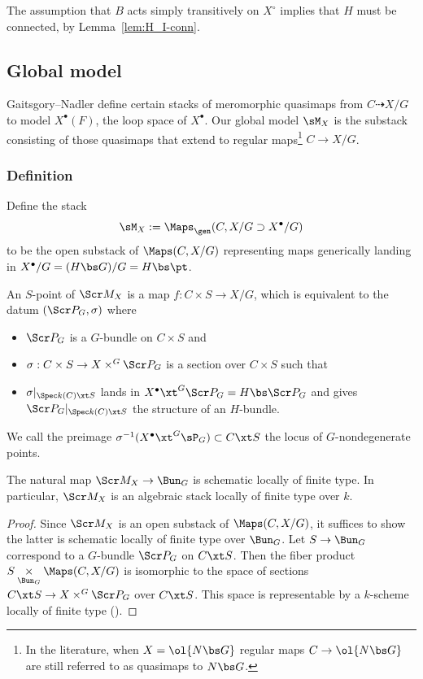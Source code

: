 \begin{rem}
\notready \label{rem:Hconnected}
The assumption that $B$ acts simply transitively on $X^\circ$ implies that $H$ must
be connected, by Lemma~\ref{lem:H_I-conn}.
\end{rem}


\subsection{Global model}

Gaitsgory--Nadler \cite{GN} define certain stacks of meromorphic quasimaps from $C \dashrightarrow X/G$
to model $X^\bullet(F)$, the loop space of $X^\bullet$.
Our global model $\sM_X$ is the substack consisting of those quasimaps that
extend to regular maps\footnote{In the literature, when $X=\ol{N\bs G}$ regular maps
$C \to \ol{N\bs G}$ are still referred to as quasimaps to $N\bs G$.} $C \to X/G$.

\subsubsection{Definition}
Define the stack
\[ \sM_{X} := \Maps_\gen(C, X/ G \supset X^\bullet /G) \]
to be the open substack of $\Maps(C, X/G)$ representing maps generically
landing in $X^\bullet/G = (H\bs G)/G = H\bs\pt$.



An $S$-point of $\Scr M_{X}$ is a map $f : C\times S \to X/G$, which is
equivalent to the datum $(\Scr P_G, \sigma)$ where
\begin{itemize}
\item $\Scr P_G$ is a $G$-bundle on $C\times S$ and
\item $\sigma : C\times S \to X\times^G \Scr P_G$ is a section over $C\times S$
such that
\item $\sigma|_{\Spec k(C) \xt S}$ lands in $X^\bullet \xt^G \Scr P_G = H\bs \Scr P_G$
and gives $\Scr P_G |_{\Spec k(C)\xt S}$ the structure of an $H$-bundle.
\end{itemize}
We call the preimage $\sigma^{-1}(X^\bullet \xt^G \sP_G)\subset C \xt S$ the
locus of $G$-nondegenerate points.

\begin{prop}
\notready
The natural map $\Scr M_{X} \to \Bun_G$ is schematic locally of finite type.
In particular, $\Scr M_{X}$ is an algebraic stack locally of finite type over $k$.
\end{prop}
\begin{proof}
Since $\Scr M_{X}$ is an open substack of $\Maps(C, X/G)$,
it suffices to show the latter is schematic locally of finite type
over $\Bun_G$.
Let $S \to \Bun_G$ correspond to a $G$-bundle $\Scr P_G$ on $C\xt S$.
Then the fiber product $S \underset{\Bun_G}\times \Maps(C, X/G)$
is isomorphic to the space of sections $C\xt S \to X \times^G \Scr P_G$ over $C \xt S$.
This space is representable by a $k$-scheme locally of finite type
(\cite[Theorem 5.23]{FGA-explained}).
\end{proof}

